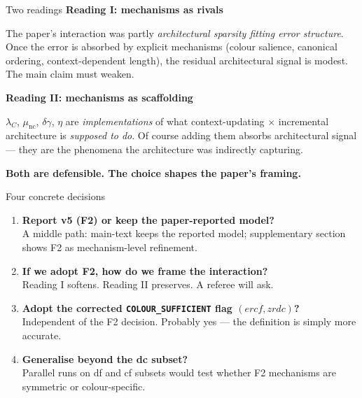 \documentclass[10pt,aspectratio=169]{beamer}
\newcommand{\hl}[1]{{\color{hlblue}\textbf{#1}}}
\begin{document}
\begin{frame}{Two readings}
\small
\textbf{\color{hlblue}Reading I: mechanisms as rivals}

The paper's interaction was partly \emph{architectural sparsity fitting error structure}. Once the error is absorbed by explicit mechanisms (colour salience, canonical ordering, context-dependent length), the residual architectural signal is modest. The main claim must weaken.

\vspace{1em}
\textbf{\color{hlgold}Reading II: mechanisms as scaffolding}

$\lambda_C$, $\mu_\mathrm{nc}$, $\delta\gamma$, $\eta$ are \emph{implementations} of what context-updating $\times$ incremental architecture is \emph{supposed to do}. Of course adding them absorbs architectural signal --- they are the phenomena the architecture was indirectly capturing.

\vspace{1em}
\hl{Both are defensible. The choice shapes the paper's framing.}
\end{frame}

\begin{frame}{Four concrete decisions}
\begin{enumerate}\itemsep0.4em
  \item \textbf{Report v5 (F2) or keep the paper-reported model?}\\
  \small A middle path: main-text keeps the reported model; supplementary section shows F2 as mechanism-level refinement.

  \item \textbf{If we adopt F2, how do we frame the interaction?}\\
  \small Reading I softens. Reading II preserves. A referee will ask.

  \item \textbf{Adopt the corrected \texttt{COLOUR\_SUFFICIENT} flag $(ercf, zrdc)$?}\\
  \small Independent of the F2 decision. Probably yes --- the definition is simply more accurate.

  \item \textbf{Generalise beyond the dc subset?}\\
  \small Parallel runs on df and cf subsets would test whether F2 mechanisms are symmetric or colour-specific.
\end{enumerate}
\end{frame}
\end{document}
